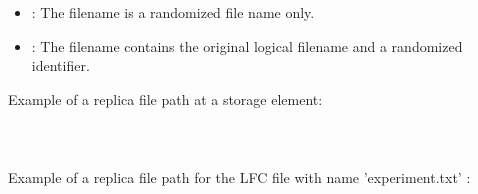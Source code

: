 \begin{itemize}
  \item {} : The filename is a randomized file name only.  
  \item {} : The filename contains the original logical filename
  and a randomized identifier. 
\end{itemize}

Example of a  replica file path at a storage element:\\
\\
\tab
{}
\\
\\
Example of a  replica file path for the LFC file with name
'experiment.txt' :\\
\\ 
\tab
{}
\\

%  
% 
%  
% 
% 


